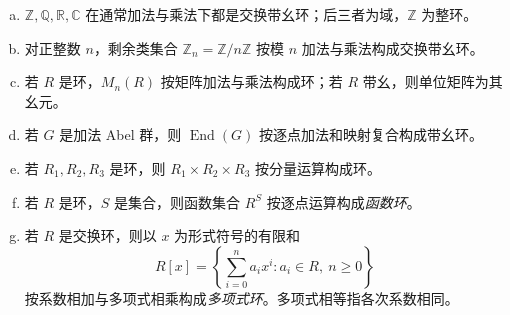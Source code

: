 \documentclass[lang=cn,a4paper,fontset=none,zihao=false,10pt,openany,twoside]{beautybook}
\numberwithin{algorithm}{chapter}
\begin{document}
\begin{example}[环的基本例子]
\begin{enumerate}[(a)]
\item $\mathbb Z,\mathbb Q,\mathbb R,\mathbb C$ 在通常加法与乘法下都是交换带幺环；后三者为域，$\mathbb Z$ 为整环。
\item 对正整数 $n$，剩余类集合 $\mathbb Z_n=\mathbb Z/n\mathbb Z$ 按模 $n$ 加法与乘法构成交换带幺环。
\item 若 $R$ 是环，$M_n(R)$ 按矩阵加法与乘法构成环；若 $R$ 带幺，则单位矩阵为其幺元。
\item 若 $G$ 是加法 Abel 群，则 $\operatorname{End}(G)$ 按逐点加法和映射复合构成带幺环。
\item 若 $R_1,R_2,R_3$ 是环，则 $R_1\times R_2\times R_3$ 按分量运算构成环。
\item 若 $R$ 是环，$S$ 是集合，则函数集合 $R^S$ 按逐点运算构成\emph{函数环}。
\item 若 $R$ 是交换环，则以 $x$ 为形式符号的有限和
\[
 R[x]=\left\{\sum_{i=0}^n a_ix^i:a_i\in R,\ n\ge0\right\}
\]
按系数相加与多项式相乘构成\emph{多项式环}。多项式相等指各次系数相同。
\end{enumerate}
\end{example}
\end{document}
